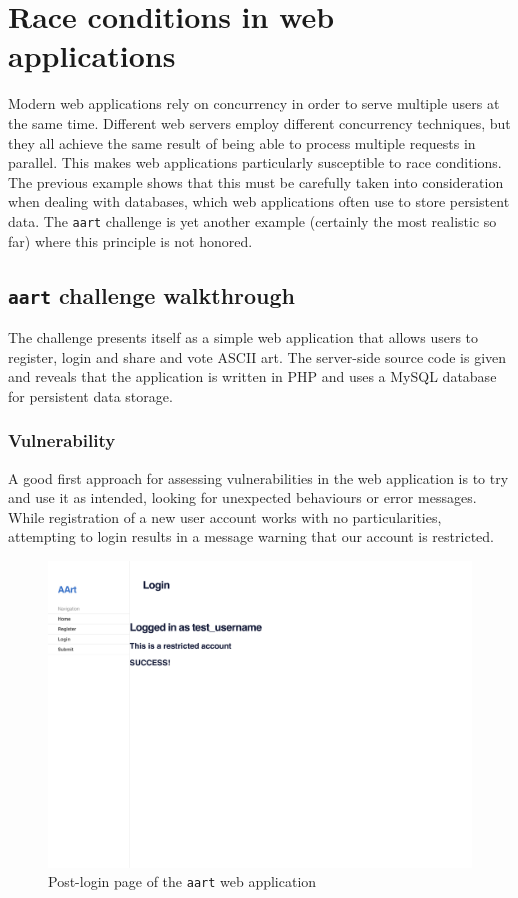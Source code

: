 \section{Race conditions in web applications}

Modern web applications rely on concurrency in order to serve multiple users at the same time. Different web servers employ different concurrency techniques, but they all achieve the same result of being able to process multiple requests in parallel. This makes web applications particularly susceptible to race conditions. \\

The previous example shows that this must be carefully taken into consideration when dealing with databases, which web applications often use to store persistent data. The \texttt{aart} challenge is yet another example (certainly the most realistic so far) where this principle is not honored.

\subsection{\texttt{aart} challenge walkthrough}

The challenge presents itself as a simple web application that allows users to register, login and share and vote ASCII art. The server-side source code is given and reveals that the application is written in PHP and uses a MySQL database for persistent data storage. \\

\subsubsection{Vulnerability}
 
A good first approach for assessing vulnerabilities in the web application is to try and use it as intended, looking for unexpected behaviours or error messages. While registration of a new user account works with no particularities, attempting to login results in a message warning that our account is restricted.

\begin{figure}[h]
\includegraphics[width=\textwidth]{img/aart_login.pdf}
\caption{Post-login page of the \texttt{aart} web application}
\label{fig:aartlogin}
\end{figure}

